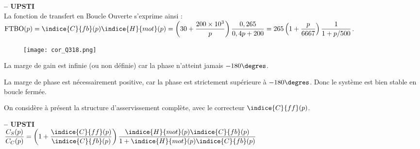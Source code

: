 \ifprof
\begin{corrige}\textbf{ -- UPSTI}\\ 
La fonction de transfert en Boucle Ouverte s’exprime ainsi :
$\text{FTBO}(p)=\indice{C}{fb} (p) \indice{H}{mot} (p)=\left(30+\dfrac{200\times 10^3}{p}\right)
\dfrac{0,265}{0,4p+200}=265\left(1+\dfrac{p}{6667}\right)\dfrac{1}{1+p/500}$.

\begin{figure}[H]
\centering
\texttt{[image: cor\_Q318.png]}
\end{figure}

La marge de gain est infinie (ou non définie) car la phase n’atteint jamais $-180\degres$.

La marge de phase est nécessairement positive, car la phase est strictement supérieure à $-180\degres$. Donc le système est bien stable en boucle fermée.


\end{corrige}
\else
\fi


On considère à présent la structure d'asservissement complète, avec le correcteur $\indice{C}{ff} (p)$.

\ifprof
\begin{corrige}\textbf{ -- UPSTI}\\ 
$\dfrac{C_S (p)}{C_C (p)}=\left(
1+\dfrac{\indice{C}{ff} (p)}{\indice{C}{fb} (p)}\right)
\dfrac{\indice{H}{mot}(p) \indice{C}{fb}(p)}{1+\indice{H}{mot}(p) \indice{C}{fb}(p)}$

\end{corrige}
\else
\fi

